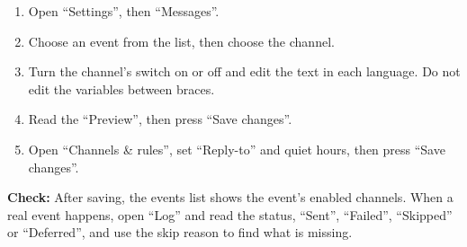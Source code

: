 \begin{enumerate}
\item Open “Settings”, then “Messages”.
\item Choose an event from the list, then choose the channel.
\item Turn the channel’s switch on or off and edit the text in each language. Do not edit the variables between braces.
\item Read the “Preview”, then press “Save changes”.
\item Open “Channels \& rules”, set “Reply-to” and quiet hours, then press “Save changes”.
\end{enumerate}

\textbf{Check:} After saving, the events list shows the event’s enabled channels. When a real event happens, open “Log” and read the status, “Sent”, “Failed”, “Skipped” or “Deferred”, and use the skip reason to find what is missing.

